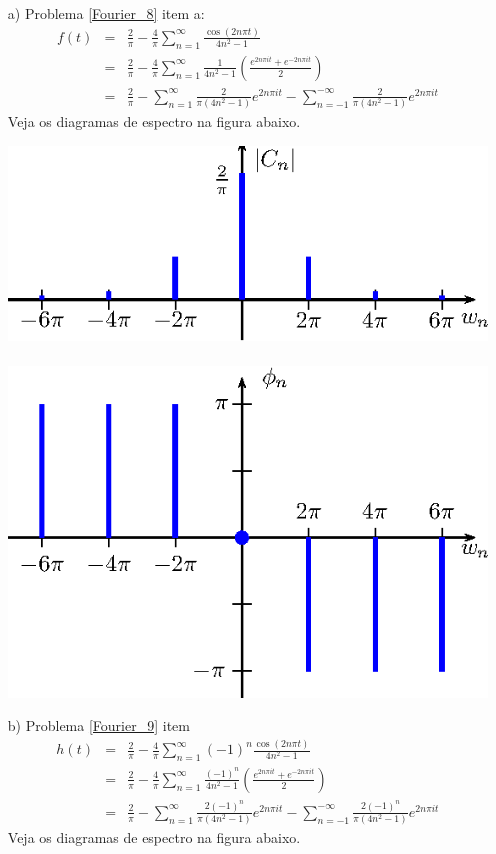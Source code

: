 \begin{resp}
\begin{itemize}
\item[a)] Problema \ref{Fourier_8} item a:
\begin{eqnarray*}
f(t)&=&\frac{2}{\pi}- \frac{4}{\pi}\sum_{n=1}^\infty \frac{\cos(2n\pi t)}{4n^2-1}\\
&=&\frac{2}{\pi}- \frac{4}{\pi}\sum_{n=1}^\infty \frac{1}{4n^2-1}\left(\frac{e^{2 n\pi it}+e^{-2n\pi it}}{2}\right)\\
&=&\frac{2}{\pi}- \sum_{n=1}^\infty \frac{2}{\pi(4n^2-1)}e^{2 n\pi it}- \sum_{n=-1}^{-\infty} \frac{2}{\pi(4n^2-1)}e^{2n\pi it}
  \end{eqnarray*}
Veja os diagramas de espectro na figura abaixo.

\includegraphics{cap_diagramas_espectro/pics/figura_21}~\includegraphics{cap_diagramas_espectro/pics/figura_22}

\item[b)] Problema \ref{Fourier_9} item
\begin{eqnarray*}
h(t)&=&\frac{2}{\pi}- \frac{4}{\pi}\sum_{n=1}^\infty (-1)^n\frac{\cos(2n\pi t)}{4n^2-1}\\
&=&\frac{2}{\pi}- \frac{4}{\pi}\sum_{n=1}^\infty \frac{(-1)^n}{4n^2-1}\left(\frac{e^{2 n\pi it}+e^{-2n\pi it}}{2}\right)\\
&=&\frac{2}{\pi}- \sum_{n=1}^\infty \frac{2(-1)^n}{\pi(4n^2-1)}e^{2 n\pi it}- \sum_{n=-1}^{-\infty} \frac{2(-1)^n}{\pi(4n^2-1)}e^{2n\pi it}
  \end{eqnarray*}
	Veja os diagramas de espectro na figura abaixo.


\end{itemize}
\end{resp}
